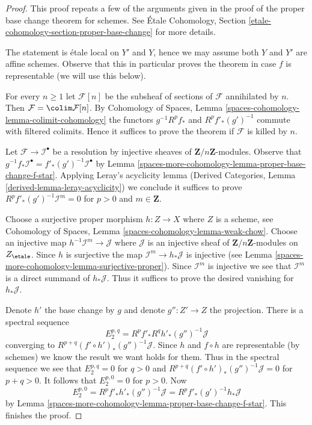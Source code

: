\begin{proof}
This proof repeats a few of the arguments given in the proof of the
proper base change theorem for schemes. See
\'Etale Cohomology, Section \ref{etale-cohomology-section-proper-base-change}
for more details.

\medskip\noindent
The statement is \'etale local on $Y'$ and $Y$, hence we may assume
both $Y$ and $Y'$ are affine schemes. Observe that this in particular
proves the theorem in case $f$ is representable (we will use this
below).

\medskip\noindent
For every $n \geq 1$ let $\mathcal{F}[n]$ be the subsheaf of sections
of $\mathcal{F}$ annihilated by $n$. Then
$\mathcal{F} = \colim \mathcal{F}[n]$. By
Cohomology of Spaces, Lemma \ref{spaces-cohomology-lemma-colimit-cohomology}
the functors $g^{-1}R^pf_*$ and $R^pf'_*(g')^{-1}$ commute
with filtered colimits. Hence it suffices to prove the theorem
if $\mathcal{F}$ is killed by $n$.

\medskip\noindent
Let $\mathcal{F} \to \mathcal{I}^\bullet$ be a resolution by
injective sheaves of $\mathbf{Z}/n\mathbf{Z}$-modules.
Observe that
$g^{-1}f_*\mathcal{I}^\bullet = f'_*(g')^{-1}\mathcal{I}^\bullet$
by Lemma \ref{spaces-more-cohomology-lemma-proper-base-change-f-star}.
Applying Leray's acyclicity lemma
(Derived Categories, Lemma \ref{derived-lemma-leray-acyclicity})
we conclude it suffices to prove
$R^pf'_*(g')^{-1}\mathcal{I}^m = 0$ for $p > 0$ and $m \in \mathbf{Z}$.

\medskip\noindent
Choose a surjective proper morphism
$h : Z \to X$ where $Z$ is a scheme, see
Cohomology of Spaces, Lemma \ref{spaces-cohomology-lemma-weak-chow}.
Choose an injective map $h^{-1}\mathcal{I}^m \to \mathcal{J}$
where $\mathcal{J}$ is an injective sheaf of
$\mathbf{Z}/n\mathbf{Z}$-modules on $Z_\etale$.
Since $h$ is surjective the map $\mathcal{I}^m \to h_*\mathcal{J}$
is injective (see Lemma \ref{spaces-more-cohomology-lemma-surjective-proper}).
Since $\mathcal{I}^m$ is injective we see that $\mathcal{I}^m$
is a direct summand of $h_*\mathcal{J}$. Thus it suffices
to prove the desired vanishing for $h_*\mathcal{J}$.

\medskip\noindent
Denote $h'$ the base change by $g$ and denote $g'' : Z' \to Z$
the projection. There is a spectral sequence
$$
E_2^{p, q} = R^pf'_* R^qh'_* (g'')^{-1}\mathcal{J}
$$
converging to $R^{p + q}(f' \circ h')_*(g'')^{-1}\mathcal{J}$.
Since $h$ and $f \circ h$ are representable (by schemes)
we know the result we want holds for them. Thus in the
spectral sequence we see that $E_2^{p, q} = 0$ for $q > 0$
and $R^{p + q}(f' \circ h')_*(g'')^{-1}\mathcal{J} = 0$
for $p + q > 0$. It follows that $E_2^{p, 0} = 0$ for $p > 0$.
Now
$$
E_2^{p, 0} = R^pf'_* h'_* (g'')^{-1}\mathcal{J} =
R^pf'_* (g')^{-1}h_*\mathcal{J}
$$
by Lemma \ref{spaces-more-cohomology-lemma-proper-base-change-f-star}. This finishes the proof.
\end{proof}

